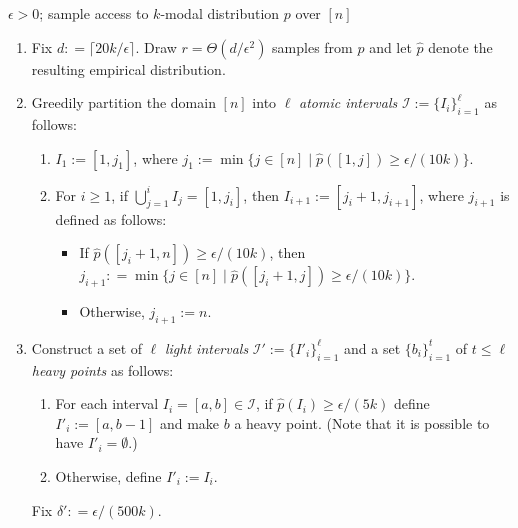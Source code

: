 \documentclass[10pt]{article}
\theoremstyle{definition}
\numberwithin{equation}{section}
\newcommand{\eps}{\epsilon}
\newcommand{\wh}[1]{{\widehat{#1}}}
\begin{document}
\begin{algorithm}
\medskip

 $\eps >0$; sample access to $k$-modal
distribution $p$ over $[n]$

%

\begin{enumerate}

\item {Fix $d: = \lceil 20k/\eps \rceil$. Draw $ r = \Theta(d/\eps^2)$} samples
        from $p$ and let $\wh{p}$ denote the resulting empirical distribution.

%


\item Greedily partition the domain $[n]$ into $\ell$ \emph{atomic intervals} $\mathcal{I}:= \{I_i\}_{i=1}^{\ell}$ as follows:
          \begin{enumerate}
          \item[(a)] $I_1 := [1, j_1]$, where $j_1 := \min\{ j \in [n] \mid \wh{p}([1,j]) \geq \eps/(10k)\}$.
           \item[(b)] For $i \geq 1$, if $\bigcup_{j=1}^i I_j = [1, j_i]$, then $I_{i+1}:=[j_i+1, j_{i+1}]$, where
           $j_{i+1}$ is defined as follows: 
           \begin{itemize}
          \item If $\wh{p}([j_i+1, n]) \geq \eps/(10k)$, then $j_{i+1}: = \min\{ j \in [n] \mid \wh{p}([j_{i}+1, j]) \geq \eps/(10k)\}${.}
           \item Otherwise, $j_{i+1} := n$.
           \end{itemize}
           \end{enumerate}

\item Construct a set of $\ell$ \emph{light intervals}  $\mathcal{I'}:= \{I'_i\}_{i=1}^{\ell}$ and a set $\{b_i\}_{i=1}^t$ of $t \leq \ell$ \emph{heavy points} as follows:
          \begin{enumerate}
             \item[(a)] For each interval $I_i = [a,b] \in \mathcal{I}$, if $\wh{p}(I_{{i}}) \geq \eps/(5k)$ define $I'_i:= [a,b-1]$ and make $b$ a heavy point.
                             (Note that it is possible to have $I'_i=\emptyset$.)
             \item[(b)] Otherwise, define $I'_i :=I_i$.
          \end{enumerate}

\smallskip

\noindent Fix $\delta': = {\eps / (500k)}$.


\end{enumerate}
\end{algorithm}
\end{document}

